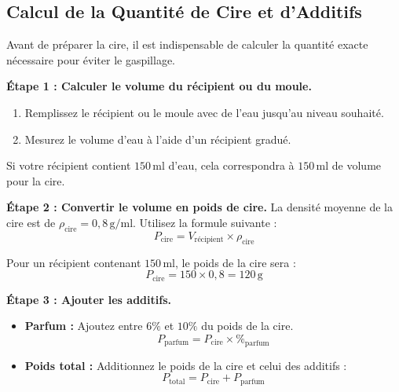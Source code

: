 \documentclass[11pt,fleqn,onecolumn,oneside]{book}
\begin{document}
\subsection*{Calcul de la Quantité de Cire et d’Additifs}

Avant de préparer la cire, il est indispensable de calculer la quantité exacte nécessaire pour éviter le gaspillage.

\begin{definition}
\textbf{Étape 1 : Calculer le volume du récipient ou du moule.}
\begin{enumerate}
    \item Remplissez le récipient ou le moule avec de l’eau jusqu’au niveau souhaité.
    \item Mesurez le volume d’eau à l’aide d’un récipient gradué.
\end{enumerate}
\end{definition}

\begin{example}
Si votre récipient contient \(150 \, \text{ml}\) d’eau, cela correspondra à \(150 \, \text{ml}\) de volume pour la cire.
\end{example}

\begin{definition}
\textbf{Étape 2 : Convertir le volume en poids de cire.}
La densité moyenne de la cire est de \(\rho_{\text{cire}} = 0,8 \, \text{g/ml}\). Utilisez la formule suivante :
\[
P_{\text{cire}} = V_{\text{récipient}} \times \rho_{\text{cire}}
\]
\end{definition}

\begin{example}
Pour un récipient contenant \(150 \, \text{ml}\), le poids de la cire sera :
\[
P_{\text{cire}} = 150 \times 0,8 = 120 \, \text{g}
\]
\end{example}

\begin{definition}
\textbf{Étape 3 : Ajouter les additifs.}
\begin{itemize}
    \item \textbf{Parfum :} Ajoutez entre \(6 \%\) et \(10 \%\) du poids de la cire.
    \[
    P_{\text{parfum}} = P_{\text{cire}} \times \%_{\text{parfum}}
    \]
    \item \textbf{Poids total :} Additionnez le poids de la cire et celui des additifs :
    \[
    P_{\text{total}} = P_{\text{cire}} + P_{\text{parfum}}
    \]
\end{itemize}
\end{definition}
\end{document}
